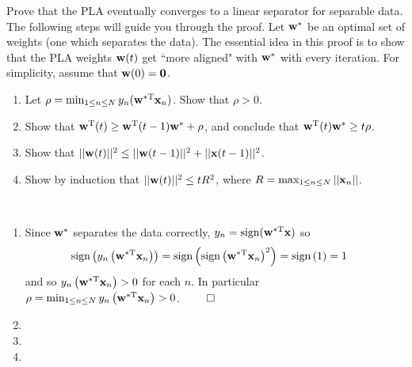 \documentclass{amsart}
\begin{document}
\begin{problem}[1.3]
  Prove that the PLA eventually converges to a linear separator for separable
  data. The following steps will guide you through the proof. Let \({\bf w}^*\)
  be an optimal set of weights (one which separates the data). The essential
  idea in this proof is to show that the PLA weights \({\bf w}(t)\) get ``more
  aligned" with \({\bf w}^*\) with every iteration. For simplicity, assume that
  \({\bf w}(0) = {\bf 0}\).
  \begin{enumerate}
    \item Let \(\rho = \min_{1\leq n\leq N}
      y_n({\bf w}^{*\textup{T}}{\bf x}_n)\). Show that
      \(\rho > 0\).
    \item Show that \({\bf w}^\textup{T}(t) \geq
      {\bf w}^\textup{T}(t-1){\bf w}^* + \rho\), and conclude that
      \({\bf w}^\textup{T}(t){\bf w}^* \geq t\rho\).
    \item Show that \(||{\bf w}(t)||^2 \leq
      ||{\bf w}(t-1)||^2 + ||{\bf x}(t-1)||^2\).
    \item Show by induction that \(||{\bf w}(t)||^2 \leq tR^2\), where
      \(R = \max_{1\leq n\leq N}||{\bf x}_n||\).
  \end{enumerate}
\end{problem}

\begin{solution}\ 
  \begin{enumerate}
    \item Since \({\bf w}^*\) separates the data correctly,
      \(y_n = \textup{sign}({\bf w}^{*\textup{T}}{\bf x})\) so
      \begin{align*}
        \textup{sign}\left(y_n\left({\bf w}^{*\textup{T}}{\bf x}_n\right)\right)
          &= \textup{sign}\left(
            \textup{sign}\left({\bf w}^{*\textup{T}}{\bf x}_n\right)^2
            \right) = \textup{sign}\left(1\right) = 1
      \end{align*}
      and so \(y_n\left({\bf w}^{*\textup{T}}{\bf x}_n\right) > 0\) for each
      \(n\). In particular \(\rho = \min_{1\leq n\leq N}
      y_n\left({\bf w}^{*\textup{T}}{\bf x}_n\right) > 0\). \(\qed\)
    \item
    \item
    \item
  \end{enumerate}
\end{solution}
\end{document}
